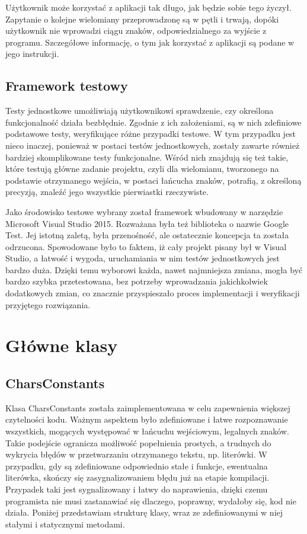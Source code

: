 \documentclass[oneside,a4paper]{book}
\begin{document}
	Użytkownik może korzystać z aplikacji tak długo, jak będzie sobie tego życzył. Zapytanie o kolejne wielomiany przeprowadzonę są w pętli i trwają, dopóki użytkownik nie wprowadzi ciągu znaków, odpowiedzialnego za wyjście z programu. Szczegółowe informację, o tym jak korzystać z aplikacji są podane w jego instrukcji.
	
	\subsection{Framework testowy}
	Testy jednostkowe umożliwiają użytkownikowi sprawdzenie, czy określona funkcjonalność działa bezbłędnie. Zgodnie z ich założeniami, są w nich zdefiniowe podstawowe testy, weryfikujące różne przypadki testowe. W tym przypadku jest nieco inaczej, ponieważ w postaci testów jednostkowych, zostały zawarte również bardziej skomplikowane testy funkcjonalne. Wśród nich znajdują się też takie, które testują główne zadanie projektu, czyli dla wielomianu, tworzonego na podstawie otrzymanego wejścia, w postaci łańcucha znaków, potrafią, z określoną precyzją, znaleźć jego wszystkie pierwiastki rzeczywiste.
	
	Jako środowisko testowe wybrany został framework wbudowany w narzędzie Microsoft Visual Studio 2015. Rozważana była też biblioteka o nazwie Google Test. Jej istotną zaletą, była przenośność, ale ostatecznie koncepcja ta została odrzucona. Spowodowane było to faktem, iż cały projekt pisany był w Visual Studio, a łatwość i wygoda, uruchamiania w nim testów jednostkowych jest bardzo duża. Dzięki temu wyborowi każda, nawet najmniejsza zmiana, mogła być bardzo szybka przetestowana, bez potrzeby wprowadzania jakichkolwiek dodatkowych zmian, co znacznie przyspieszało proces implementacji i weryfikacji przyjętego rozwiązania.
	
	\section{Główne klasy}
	
	\subsection{CharsConstants}
	
	Klasa CharsConstants została zaimplementowana w celu zapewnienia większej czytelności kodu. Ważnym aspektem było zdefiniowane i łatwe rozpoznawanie wszystkich, mogących występować w łańcuchu wejściowym, legalnych znaków. Takie podejście ogranicza możliwość popełnienia prostych, a trudnych do wykrycia błędów w przetwarzaniu otrzymanego tekstu, np. literówki. W przypadku, gdy są zdefiniowane odpowiednio stałe i funkcje, ewentualna literówka, skończy się zasygnalizowaniem błędu już na etapie kompilacji. Przypadek taki jest sygnalizowany i łatwy do naprawienia, dzięki czemu programista nie musi zastanawiać się dlaczego, poprawny, wydałoby się, kod nie działa. Poniżej przedstawiam strukturę klasy, wraz ze zdefiniowanymi w niej stałymi i statycznymi metodami. 
	
\end{document}
